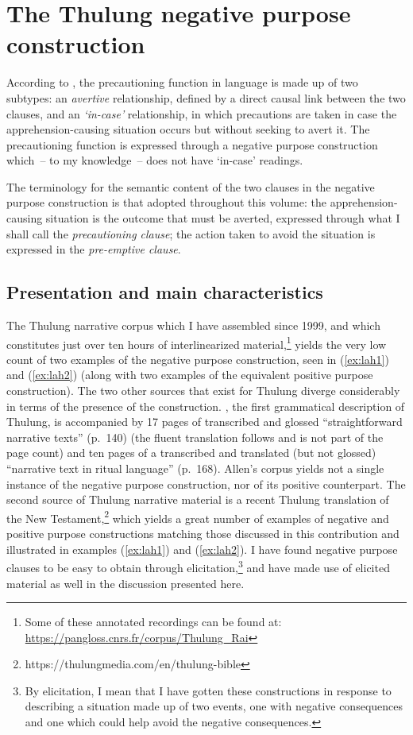\documentclass[output=paper,colorlinks,citecolor=brown,
]{langscibook}
\begin{document}
\section{The Thulung negative purpose construction}
\label{sec:Tnegpur}

According to \citet[302]{lichtenberk1995}, the precautioning function in language is made up of two subtypes: an \textit{avertive} relationship, defined by a direct causal link between the two clauses, and an \textit{`in-case'} relationship, in which precautions are taken in case the apprehension\hyp causing situation occurs but without seeking to avert it. The precautioning function is expressed through a negative purpose construction which~-- to my knowledge~-- does not have `in-case' readings.

The terminology for the semantic content of the two clauses in the negative purpose construction is that adopted throughout this volume: the apprehension-causing situation is the outcome that must be averted, expressed through what I shall call the \textit{precautioning clause}; the action taken to avoid the situation is expressed in the \textit{pre-emptive clause}. 



\subsection{Presentation and main characteristics}
\label{subsec:presentation}

The Thulung narrative corpus which I have assembled since 1999, and which constitutes just over ten hours of interlinearized material,\footnote{Some of these annotated recordings can be found at: \url{https://pangloss.cnrs.fr/corpus/Thulung\_Rai}} yields the very low count of two examples of the negative purpose construction, seen in (\ref{ex:lah1}) and (\ref{ex:lah2}) (along with two examples of the equivalent positive purpose construction). The two other sources that exist for Thulung diverge considerably in terms of the presence of the construction. \citet{Allen1975}, the first grammatical description of Thulung, is accompanied by 17 pages of transcribed and glossed ``straightforward narrative texts'' (p.\ 140) (the fluent translation follows and is not part of the page count) and ten pages of a transcribed and translated (but not glossed) ``narrative text in ritual language'' (p.\ 168). Allen's corpus yields not a single instance of the negative purpose construction, nor of its positive counterpart. The second source of Thulung narrative material is a recent Thulung translation of the New Testament,\footnote{https://thulungmedia.com/en/thulung-bible} which yields a great number of examples of negative and positive purpose constructions matching those discussed in this contribution and illustrated in examples (\ref{ex:lah1}) and (\ref{ex:lah2}). I have found negative purpose clauses to be easy to obtain through elicitation,\footnote{By elicitation, I mean that I have gotten these constructions in response to describing a situation made up of two events, one with negative consequences and one which could help avoid the negative consequences.} and have made use of elicited material as well in the discussion presented here.
\end{document}

